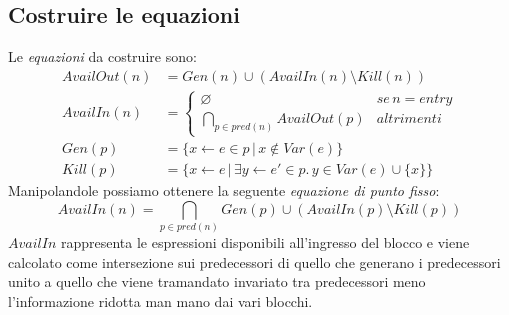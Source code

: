 \documentclass[a4paper,oneside,titlepage]{book}
\begin{document}
\subsection{Costruire le equazioni}
\label{avail2}
Le \textit{equazioni} da costruire sono:
\begin{align*}
    AvailOut(n) &= Gen(n) \cup (AvailIn(n) \setminus Kill(n)) \\
    AvailIn(n) &= 
    	\begin{cases}
    		\varnothing & se \, n=entry \\
    		\bigcap_{p \in pred(n)} AvailOut(p) & altrimenti
    	\end{cases} \\
    Gen(p) &= \{ x \leftarrow e \in p \, | \, x \notin Var(e) \} \\
    Kill(p) &= \{ x \leftarrow e \, | \, \exists y \leftarrow e' \in p. \, y \in Var(e) \cup \{ x \} \}
\end{align*}
Manipolandole possiamo ottenere la seguente \textit{equazione di punto fisso}:
\[ AvailIn(n) = \bigcap_{p \in pred(n)} Gen(p) \cup (AvailIn(p) \setminus Kill(p)) \]
$AvailIn$ rappresenta le espressioni disponibili all'ingresso del blocco e viene calcolato come intersezione sui predecessori di quello che generano i predecessori unito a quello che viene tramandato invariato tra predecessori meno l'informazione ridotta man mano dai vari blocchi. 
\end{document}
